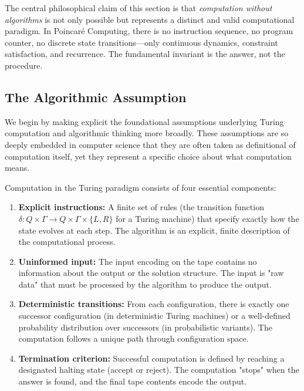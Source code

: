 The central philosophical claim of this section is that \textit{computation without algorithms} is not only possible but represents a distinct and valid computational paradigm. In Poincaré Computing, there is no instruction sequence, no program counter, no discrete state transitions—only continuous dynamics, constraint satisfaction, and recurrence. The fundamental invariant is the answer, not the procedure.

\subsection{The Algorithmic Assumption}

We begin by making explicit the foundational assumptions underlying Turing computation and algorithmic thinking more broadly. These assumptions are so deeply embedded in computer science that they are often taken as definitional of computation itself, yet they represent a specific choice about what computation means.

\begin{axiom}
\label{ax:algorithmic}
Computation in the Turing paradigm consists of four essential components:
\begin{enumerate}
    \item \textbf{Explicit instructions:} A finite set of rules (the transition function $\delta: Q \times \Gamma \to Q \times \Gamma \times \{L, R\}$ for a Turing machine) that specify exactly how the state evolves at each step. The algorithm is an explicit, finite description of the computational process.
    
    \item \textbf{Uninformed input:} The input encoding on the tape contains no information about the output or the solution structure. The input is "raw data" that must be processed by the algorithm to produce the output.
    
    \item \textbf{Deterministic transitions:} From each configuration, there is exactly one successor configuration (in deterministic Turing machines) or a well-defined probability distribution over successors (in probabilistic variants). The computation follows a unique path through configuration space.
    
    \item \textbf{Termination criterion:} Successful computation is defined by reaching a designated halting state (accept or reject). The computation "stops" when the answer is found, and the final tape contents encode the output.
\end{enumerate}
\end{axiom}

